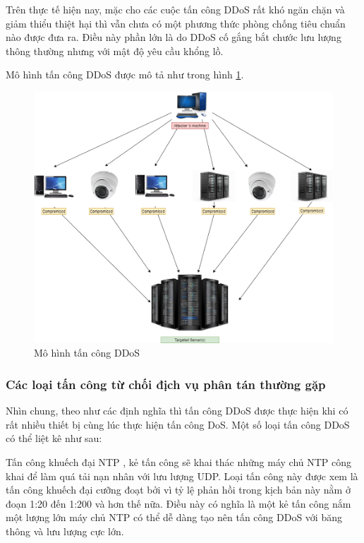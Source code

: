 Trên thực tế hiện nay, mặc cho các cuộc tấn công DDoS rất khó ngăn chặn và giảm thiểu thiệt hại thì vẫn chưa có một phương thức phòng chống tiêu chuẩn nào được đưa ra. Điều này phần lớn là do DDoS cố gắng bắt chước lưu lượng thông thường nhưng với mật độ yêu cầu khổng lồ.

Mô hình tấn công DDoS được mô tả như trong hình \ref{fig:ddos-model-example}.

\begin{figure}[ht!]
	\includegraphics[width=\linewidth]{fig/ddos-model-example.png}
	\caption{Mô hình tấn công DDoS}
	\label{fig:ddos-model-example}
\end{figure}

\subsubsection{Các loại tấn công từ chối địch vụ phân tán thường gặp}

Nhìn chung, theo như các định nghĩa thì tấn công DDoS được thực hiện khi có rất nhiều thiết bị cùng lúc thực hiện tấn công DoS. Một số loại tấn công DDoS có thể liệt kê như sau:

Tấn công khuếch đại NTP \cite{2-imperva}, kẻ tấn công sẽ khai thác những máy chủ NTP công khai để làm quá tải nạn nhân với lưu lượng UDP. Loại tấn công này được xem là tấn công khuếch đại cưỡng đoạt bởi vì tỷ lệ phản hồi trong kịch bản này nằm ở đoạn 1:20 đến 1:200 và hơn thế nữa. Điều này có nghĩa là một kẻ tấn công nắm một lượng lớn máy chủ NTP có thể dễ dàng tạo nên tấn công DDoS với băng thông và lưu lượng cực lớn.

